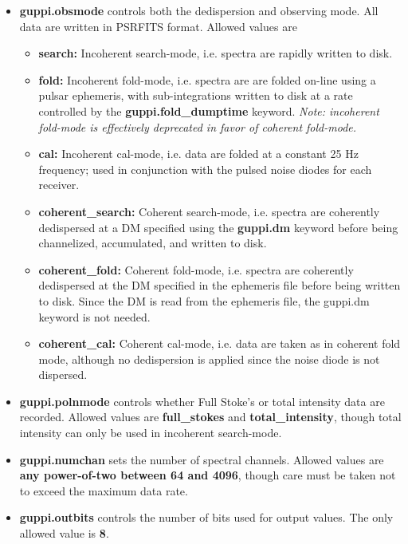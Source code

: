 \begin{itemize}
\item{\textbf{guppi.obsmode} controls both the dedispersion and
    observing mode.  All data are written in PSRFITS format.  Allowed
    values are
    \begin{itemize}
    \item{\textbf{search:} Incoherent search-mode, i.e. spectra are
        rapidly written to disk.}
    \item{\textbf{fold:} Incoherent fold-mode, i.e. spectra are are
        folded on-line using a pulsar ephemeris, with sub-integrations
        written to disk at a rate controlled by the
        \textbf{guppi.fold\_dumptime} keyword.  \emph{Note: incoherent
          fold-mode is effectively deprecated in favor of coherent
          fold-mode.}}
    \item{\textbf{cal:} Incoherent cal-mode, i.e. data are folded at a
        constant 25 Hz frequency; used in conjunction with the pulsed
        noise diodes for each receiver.}
    \item{\textbf{coherent\_search:} Coherent search-mode,
        i.e. spectra are coherently dedispersed at a DM specified
        using the \textbf{guppi.dm} keyword before being channelized,
        accumulated, and written to disk.}
    \item{\textbf{coherent\_fold:} Coherent fold-mode, i.e. spectra
        are coherently dedispersed at the DM specified in the
        ephemeris file before being written to disk.  Since the DM is
        read from the ephemeris file, the guppi.dm keyword is not
        needed.}
    \item{\textbf{coherent\_cal:} Coherent cal-mode, i.e. data are
        taken as in coherent fold mode, although no dedispersion is
        applied since the noise diode is not dispersed.}
    \end{itemize}}
\item{\textbf{guppi.polnmode} controls whether Full Stoke's or total
    intensity data are recorded.  Allowed values are
    \textbf{full\_stokes} and \textbf{total\_intensity}, though total
    intensity can only be used in incoherent search-mode.}
\item{\textbf{guppi.numchan} sets the number of spectral channels.
    Allowed values are \textbf{any power-of-two between 64 and 4096},
    though care must be taken not to exceed the maximum data rate.}
\item{\textbf{guppi.outbits} controls the number of bits used for
    output values.  The only allowed value is \textbf{8}.}

\end{itemize}
